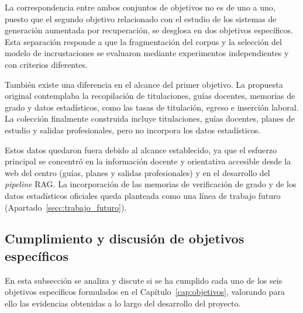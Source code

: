 

La correspondencia entre ambos conjuntos de objetivos no es de uno a uno, puesto que el segundo objetivo relacionado con el estudio de los sistemas de generación aumentada por recuperación, se desglosa en dos objetivos específicos. Esta separación responde a que la fragmentación del corpus y la selección del modelo de incrustaciones se evaluaron mediante experimentos independientes y con criterios diferentes.

También existe una diferencia en el alcance del primer objetivo. La propuesta original contemplaba la recopilación de titulaciones, guías docentes, memorias de grado y datos estadísticos, como las tasas de titulación, egreso e inserción laboral. La colección finalmente construida incluye titulaciones, guías docentes, planes de estudio y salidas profesionales, pero no incorpora los datos estadísticos.

Estos datos quedaron fuera debido al alcance establecido, ya que el esfuerzo principal se concentró en la información docente y orientativa accesible desde la web del centro (guías, planes y salidas profesionales) y en el desarrollo del \textit{pipeline} RAG. La incorporación de las memorias de verificación de grado y de los datos estadísticos oficiales queda planteada como una línea de trabajo futuro (Apartado~\ref{secc:trabajo_futuro}).


\subsection{Cumplimiento y discusión de objetivos específicos}
\label{secc:discusion_objetivos}

En esta subsección se analiza y discute si se ha cumplido cada uno de los seis objetivos específicos formulados en el Capítulo~\ref{cap:objetivos}, valorando para ello las evidencias obtenidas a lo largo del desarrollo del proyecto.

